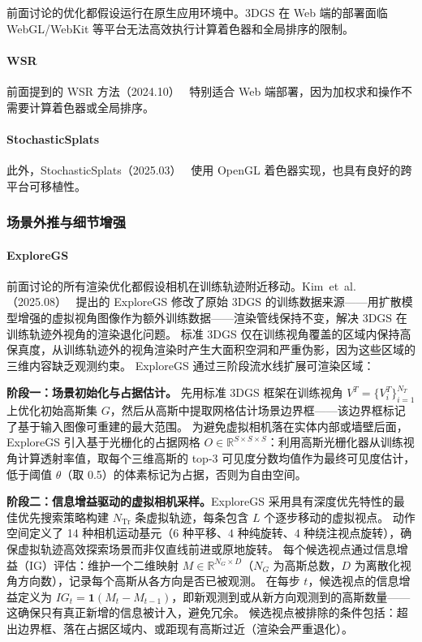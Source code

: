 前面讨论的优化都假设运行在原生应用环境中。3DGS 在 Web 端的部署面临 WebGL/WebKit 等平台无法高效执行计算着色器和全局排序的限制。

\paragraph{WSR}
前面提到的 WSR 方法（2024.10）~\cite{2410_18931} 特别适合 Web 端部署，因为加权求和操作不需要计算着色器或全局排序。
\paragraph{StochasticSplats}

此外，StochasticSplats（2025.03）~\cite{2503_24366} 使用 OpenGL 着色器实现，也具有良好的跨平台可移植性。

\subsubsection{场景外推与细节增强}

\paragraph{ExploreGS}
前面讨论的所有渲染优化都假设相机在训练轨迹附近移动。Kim~et~al.（2025.08）~\cite{2508_06014} 提出的 ExploreGS 修改了原始 3DGS 的训练数据来源——用扩散模型增强的虚拟视角图像作为额外训练数据——渲染管线保持不变，解决 3DGS 在训练轨迹外视角的渲染退化问题。
标准 3DGS 仅在训练视角覆盖的区域内保持高保真度，从训练轨迹外的视角渲染时产生大面积空洞和严重伪影，因为这些区域的三维内容缺乏观测约束。
ExploreGS 通过三阶段流水线扩展可渲染区域：

\textbf{阶段一：场景初始化与占据估计。}
先用标准 3DGS 框架在训练视角 $V^T = \{V_i^T\}_{i=1}^{N_T}$ 上优化初始高斯集 $G$，然后从高斯中提取网格估计场景边界框——该边界框标记了基于输入图像可重建的最大范围。
为避免虚拟相机落在实体内部或墙壁后面，ExploreGS 引入基于光栅化的占据网格 $O \in \mathbb{R}^{S \times S \times S}$：利用高斯光栅化器从训练视角计算透射率值，取每个三维高斯的 top-3 可见度分数均值作为最终可见度估计，低于阈值 $\theta$（取 0.5）的体素标记为占据，否则为自由空间。

\textbf{阶段二：信息增益驱动的虚拟相机采样。}ExploreGS 采用具有深度优先特性的最佳优先搜索策略构建 $N_\text{Tr}$ 条虚拟轨迹，每条包含 $L$ 个逐步移动的虚拟视点。
动作空间定义了 14 种相机运动基元（6 种平移、4 种纯旋转、4 种绕注视点旋转），确保虚拟轨迹高效探索场景而非仅直线前进或原地旋转。
每个候选视点通过信息增益（IG）评估：维护一个二维映射 $M \in \mathbb{R}^{N_G \times D}$（$N_G$ 为高斯总数，$D$ 为离散化视角方向数），记录每个高斯从各方向是否已被观测。
在每步 $t$，候选视点的信息增益定义为 $IG_t = \mathbf{1}(M_t - M_{t-1})$，即新观测到或从新方向观测到的高斯数量——这确保只有真正新增的信息被计入，避免冗余。
候选视点被排除的条件包括：超出边界框、落在占据区域内、或距现有高斯过近（渲染会严重退化）。

